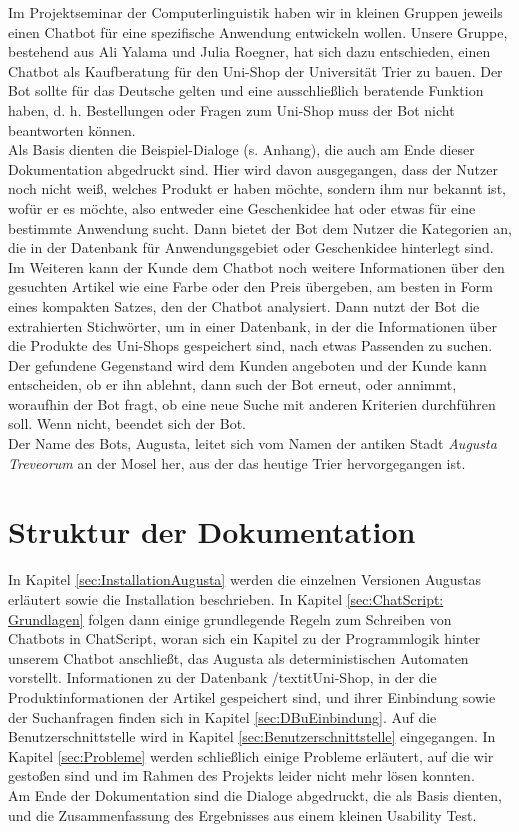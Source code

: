Im Projektseminar der Computerlinguistik haben wir in kleinen Gruppen jeweils einen Chatbot für eine spezifische Anwendung entwickeln wollen. Unsere Gruppe, bestehend aus Ali Yalama und Julia Roegner, hat sich dazu entschieden, einen Chatbot als Kaufberatung für den Uni-Shop der Universität Trier zu bauen. Der Bot sollte für das Deutsche gelten und eine ausschließlich beratende Funktion haben, d. h. Bestellungen oder Fragen zum Uni-Shop muss der Bot nicht beantworten können.\\
Als Basis dienten die Beispiel-Dialoge (s. Anhang), die auch am Ende dieser Dokumentation abgedruckt sind. Hier wird davon ausgegangen, dass der Nutzer noch nicht weiß, welches Produkt er haben möchte, sondern ihm nur bekannt ist, wofür er es möchte, also entweder eine Geschenkidee hat oder etwas für eine bestimmte Anwendung sucht. Dann bietet der Bot dem Nutzer die Kategorien an, die in der Datenbank für Anwendungsgebiet oder Geschenkidee hinterlegt sind. Im Weiteren kann der Kunde dem Chatbot noch weitere Informationen über den gesuchten Artikel wie eine Farbe oder den Preis übergeben, am besten in Form eines kompakten Satzes, den der Chatbot analysiert. Dann nutzt der Bot die extrahierten Stichwörter, um in einer Datenbank, in der die Informationen über die Produkte des Uni-Shops gespeichert sind, nach etwas Passenden zu suchen.\\
Der gefundene Gegenstand wird dem Kunden angeboten und der Kunde kann entscheiden, ob er ihn ablehnt, dann such der Bot erneut, oder annimmt, woraufhin der Bot fragt, ob eine neue Suche mit anderen Kriterien durchführen soll. Wenn nicht, beendet sich der Bot.\\
Der Name des Bots, Augusta, leitet sich vom Namen der antiken Stadt \textit{Augusta Treveorum} an der Mosel her, aus der das heutige Trier hervorgegangen ist.\\


\section{Struktur der Dokumentation}
\label{sec:Inhaltsbeschreibung} 
In Kapitel \ref{sec:InstallationAugusta} werden die einzelnen Versionen Augustas erläutert sowie die Installation beschrieben. In Kapitel \ref{sec:ChatScript: Grundlagen} folgen dann einige grundlegende Regeln zum Schreiben von Chatbots in ChatScript, woran sich ein Kapitel zu der Programmlogik hinter unserem Chatbot anschließt, das Augusta als deterministischen Automaten vorstellt. Informationen zu der Datenbank /textit{Uni-Shop}, in der die Produktinformationen der Artikel gespeichert sind, und ihrer Einbindung sowie der Suchanfragen finden sich in Kapitel \ref{sec:DBuEinbindung}. Auf die Benutzerschnittstelle wird in Kapitel \ref{sec:Benutzerschnittstelle} eingegangen. In Kapitel \ref{sec:Probleme} werden schließlich einige Probleme erläutert, auf die wir gestoßen sind und im Rahmen des Projekts leider nicht mehr lösen konnten.\\
Am Ende der Dokumentation sind die Dialoge abgedruckt, die als Basis dienten, und die Zusammenfassung des Ergebnisses aus einem kleinen Usability Test.
